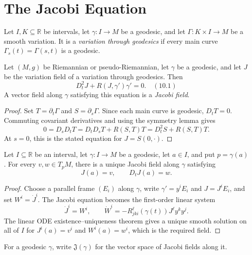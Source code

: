 \section{The Jacobi Equation}

Let $I,K\subseteq\mathbb R$ be intervals, let $\gamma:I\to M$ be a geodesic,
and let $\Gamma:K\times I\to M$ be a smooth variation.  It is a
\emph{variation through geodesics} if every main curve
$\Gamma_s(t)=\Gamma(s,t)$ is a geodesic.

\begin{theorem}
\label{thm:jacobi-equation}
Let $(M,g)$ be Riemannian or pseudo-Riemannian, let $\gamma$ be a geodesic,
and let $J$ be the variation field of a variation through geodesics.  Then
\[
D_t^2J+R(J,\gamma')\gamma'=0. \quad (10.1)
\]
A vector field along $\gamma$ satisfying this equation is a \emph{Jacobi
field}.
\end{theorem}

\begin{proof}
\sketch
Set $T=\partial_t\Gamma$ and $S=\partial_s\Gamma$.  Since each main curve is
geodesic, $D_tT=0$.  Commuting covariant derivatives and using the symmetry
lemma gives
\[
0=D_sD_tT=D_tD_sT+R(S,T)T=D_t^2S+R(S,T)T.
\]
At $s=0$, this is the stated equation for $J=S(0,\mathord\cdot)$.
\end{proof}

\begin{proposition}
\label{prop:existence-uniqueness-jacobi-fields}

Let $I\subseteq\mathbb R$ be an interval, let $\gamma:I\to M$ be a geodesic,
let $a\in I$, and put $p=\gamma(a)$.  For every $v,w\in T_pM$, there is a
unique Jacobi field along $\gamma$ satisfying
\[
J(a)=v,\qquad D_tJ(a)=w.
\]
\end{proposition}

\begin{proof}
\sketch
Choose a parallel frame $(E_i)$ along $\gamma$, write
$\gamma'=y^iE_i$ and $J=J^iE_i$, and set $W^i=\dot J^i$.  The Jacobi equation
becomes the first-order linear system
\[
\dot J^i=W^i,
\qquad
\dot W^i=-R_{jki}^{\ell}(\gamma(t))J^\ell y^ky^j.
\]
The linear ODE existence--uniqueness theorem gives a unique smooth solution on
all of $I$ for $J^i(a)=v^i$ and $W^i(a)=w^i$, which is the required field.
\end{proof}

For a geodesic $\gamma$, write $\mathfrak J(\gamma)$ for the vector space of
Jacobi fields along it.

